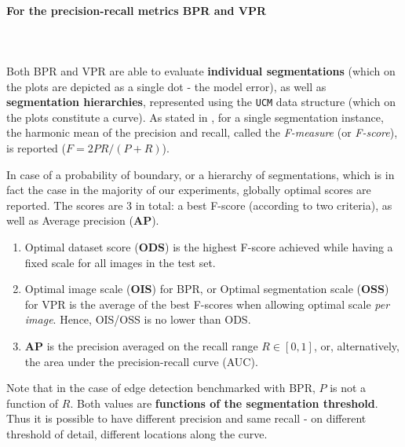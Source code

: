 \paragraph{For the precision-recall metrics BPR and VPR}\mbox{}\\\mbox{}\\
Both BPR and VPR are able to evaluate {\bf individual segmentations} (which on the plots are depicted as a single dot - the model error), as well as {\bf segmentation hierarchies}, represented using the {\tt UCM} data structure (which on the plots constitute a curve). As stated in , for a single segmentation instance, the harmonic mean of the precision and recall, called the {\it F-measure} (or {\it F-score}), is 
reported ($F=2PR/(P+R)$).

In case of a probability of boundary, or a hierarchy of segmentations, which is in fact the case in the majority of our experiments, globally optimal scores %
are reported. The scores are 3 in total: a best F-score (according to two criteria), as well as Average precision (\textbf{AP}). 

\begin{enumerate}
 \item Optimal dataset score ({\bf ODS}) is the highest F-score achieved while having a fixed scale for all images in the test set. 
 \item Optimal image scale ({\bf OIS}) for BPR, or Optimal segmentation scale (\textbf{OSS}) for VPR is the average of the best F-scores when allowing optimal scale {\it per image}. Hence, OIS\slash OSS is no lower than ODS. 
 \item {\bf AP} is the precision averaged on the recall range $R\in[0,1]$, or, alternatively, the area under the precision-recall curve (AUC).
\end{enumerate}

Note that in the case of edge detection benchmarked with BPR, $P$ is not a function of $R$. Both values are {\bf functions of the segmentation threshold}. Thus it is possible to have different precision and same recall - on different threshold of detail, \ie different locations along the curve.


